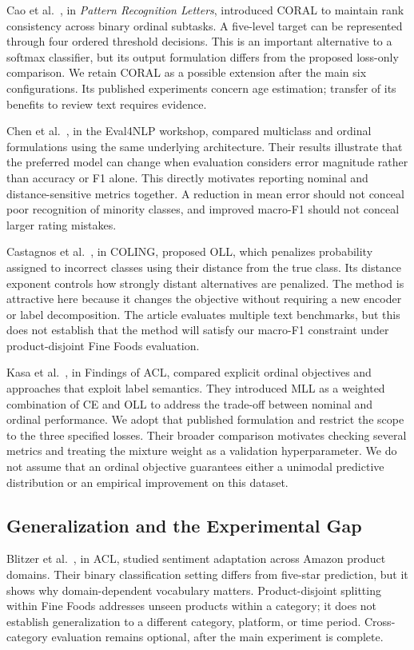\documentclass[conference]{IEEEtran}
\begin{document}
Cao et al.~\cite{coral2020}, in \emph{Pattern Recognition Letters}, introduced CORAL to maintain rank consistency across binary ordinal subtasks. A five-level target can be represented through four ordered threshold decisions. This is an important alternative to a softmax classifier, but its output formulation differs from the proposed loss-only comparison. We retain CORAL as a possible extension after the main six configurations. Its published experiments concern age estimation; transfer of its benefits to review text requires evidence.

Chen et al.~\cite{chen2021}, in the Eval4NLP workshop, compared multiclass and ordinal formulations using the same underlying architecture. Their results illustrate that the preferred model can change when evaluation considers error magnitude rather than accuracy or F1 alone. This directly motivates reporting nominal and distance-sensitive metrics together. A reduction in mean error should not conceal poor recognition of minority classes, and improved macro-F1 should not conceal larger rating mistakes.

Castagnos et al.~\cite{oll2022}, in COLING, proposed OLL, which penalizes probability assigned to incorrect classes using their distance from the true class. Its distance exponent controls how strongly distant alternatives are penalized. The method is attractive here because it changes the objective without requiring a new encoder or label decomposition. The article evaluates multiple text benchmarks, but this does not establish that the method will satisfy our macro-F1 constraint under product-disjoint Fine Foods evaluation.

Kasa et al.~\cite{mll2024}, in Findings of ACL, compared explicit ordinal objectives and approaches that exploit label semantics. They introduced MLL as a weighted combination of CE and OLL to address the trade-off between nominal and ordinal performance. We adopt that published formulation and restrict the scope to the three specified losses. Their broader comparison motivates checking several metrics and treating the mixture weight as a validation hyperparameter. We do not assume that an ordinal objective guarantees either a unimodal predictive distribution or an empirical improvement on this dataset.

\subsection{Generalization and the Experimental Gap}
Blitzer et al.~\cite{blitzer2007}, in ACL, studied sentiment adaptation across Amazon product domains. Their binary classification setting differs from five-star prediction, but it shows why domain-dependent vocabulary matters. Product-disjoint splitting within Fine Foods addresses unseen products within a category; it does not establish generalization to a different category, platform, or time period. Cross-category evaluation remains optional, after the main experiment is complete.
\end{document}
